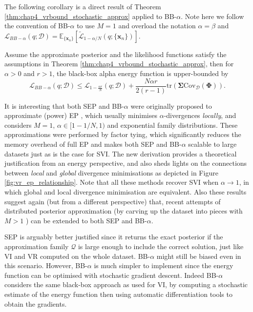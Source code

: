 The following corollary is a direct result of Theorem \ref{thm:chap4_vrbound_stochastic_approx} applied to BB-$\alpha$. Note here we follow the convention of BB-$\alpha$ to use $M = 1$ and overload the notation $\alpha = \beta$ and $\mathcal{L}_{BB-\alpha}(q; \mathcal{D}) = \mathbb{E}_{\{  \bm{x}_n\}} \left[ \tilde{\mathcal{L}}_{1 - \alpha/N}(q; \{ \bm{x}_n \}) \right]$.
\begin{corollary}
Assume the approximate posterior and the likelihood functions satisfy the assumptions in Theorem \ref{thm:chap4_vrbound_stochastic_approx}, then for $\alpha > 0$ and $r > 1$, the black-box alpha energy function is upper-bounded by
\begin{equation*}
\mathcal{L}_{BB-\alpha}(q; \mathcal{D}) \leq \mathcal{L}_{1 - \frac{\alpha r}{N}}(q; \mathcal{D}) + \frac{N \alpha r}{2(r - 1)}  \mathrm{tr}(\bm{\Sigma} \mathrm{Cov}_{\mathcal{D}}(\bm{\Phi})).
\end{equation*}
\end{corollary} 

It is interesting that both SEP and BB-$\alpha$ were originally proposed to approximate (power) EP \citep{minka:ep2001, minka:powerep2004}, which usually minimises $\alpha$-divergences \emph{locally}, and considers $M=1$, $\alpha \in [1 - 1/N, 1)$ and exponential family distributions. These approximations were performed by factor tying, which significantly reduces the memory overhead of full EP and makes both SEP and BB-$\alpha$ scalable to large datasets just as is the case for SVI. The new derivation provides a theoretical justification from an energy perspective, and also sheds lights on the connections between \emph{local} and \emph{global} divergence minimisations as depicted in Figure \ref{fig:vr_ep_relationship}. Note that all these methods recover SVI when $\alpha \rightarrow 1$, in which global and local divergence minimisation are equivalent. Also these results suggest again (but from a different perspective) that, recent attempts of distributed posterior approximation (by carving up the dataset into pieces with $M > 1$ \citep{gelman:dep2014, xu:sms2014}) can be extended to both SEP and BB-$\alpha$.

SEP is arguably better justified since it returns the exact posterior if the approximation family $\mathcal{Q}$ is large enough to include the correct solution, just like VI and VR computed on the whole dataset. BB-$\alpha$ might still be biased even in this scenario. However, BB-$\alpha$ is much simpler to implement since the energy function can be optimised with stochastic gradient descent. Indeed BB-$\alpha$ considers the same black-box approach as used for VI, by computing a stochastic estimate of the energy function then using automatic differentiation tools to obtain the gradients. 

